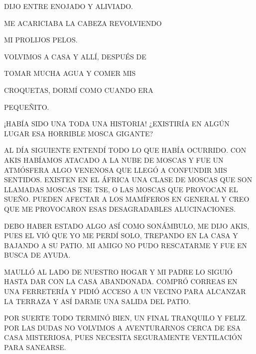 DIJO ENTRE ENOJADO Y ALIVIADO. 

ME ACARICIABA LA CABEZA REVOLVIENDO

MI PROLIJOS PELOS.

VOLVIMOS A CASA Y ALLÍ, DESPUÉS DE 

TOMAR MUCHA AGUA Y COMER MIS 

CROQUETAS, DORMÍ COMO CUANDO ERA 

PEQUEÑITO.


\newpage
{}

¡HABÍA SIDO UNA TODA UNA HISTORIA! ¿EXISTIRÍA EN ALGÚN LUGAR ESA HORRIBLE MOSCA GIGANTE? 

AL DÍA SIGUIENTE ENTENDÍ TODO LO QUE HABÍA OCURRIDO. CON AKIS HABÍAMOS ATACADO A LA NUBE DE MOSCAS Y FUE UN ATMÓSFERA ALGO VENENOSA QUE LLEGÓ A CONFUNDIR MIS SENTIDOS.
EXISTEN EN EL ÁFRICA UNA CLASE DE MOSCAS QUE SON LLAMADAS MOSCAS TSE TSE, O LAS MOSCAS QUE PROVOCAN EL SUEÑO. PUEDEN AFECTAR A LOS MAMÍFEROS EN GENERAL Y CREO QUE ME PROVOCARON ESAS DESAGRADABLES ALUCINACIONES.

DEBO HABER ESTADO ALGO ASÍ COMO SONÁMBULO, ME DIJO AKIS, PUES EL VIÓ QUE YO ME PERDÍ SOLO, TREPANDO EN LA CASA Y BAJANDO A SU PATIO. MI AMIGO NO PUDO RESCATARME Y FUE EN BUSCA DE AYUDA. 


\newpage
{}
MAULLÓ AL LADO DE NUESTRO HOGAR Y MI PADRE LO SIGUIÓ HASTA DAR CON LA CASA ABANDONADA. COMPRÓ CORREAS EN UNA FERRETERÍA Y PIDIÓ ACCESO A UN VECINO PARA ALCANZAR LA TERRAZA Y ASÍ DARME UNA SALIDA DEL PATIO.

POR SUERTE TODO TERMINÓ BIEN, UN FINAL TRANQUILO Y FELIZ. POR LAS DUDAS NO VOLVIMOS A AVENTURARNOS CERCA DE ESA CASA MISTERIOSA, PUES NECESITA SEGURAMENTE VENTILACIÓN PARA SANEARSE.
